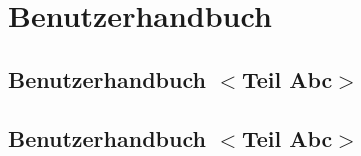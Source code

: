 
\pagestyle{scrheadings}
\clearscrheadfoot

	\chapter{Benutzerhandbuch}
	\section{Benutzerhandbuch $<$Teil Abc$>$}
	\section{Benutzerhandbuch $<$Teil Abc$>$}
